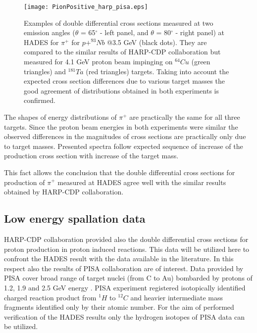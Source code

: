 \begin{figure}[!h]
    \centering
	\texttt{[image: PionPositive\_harp\_pisa.eps]}%
	\caption{\label{Comp_HARP_pip} 
		Examples of double differential cross sections measured at two emission angles 
		($\theta$ = 65$^{\circ}$ - left panel, and $\theta$ = 80$^{\circ}$ - right panel) 
		at HADES for $\pi^{+}$ for $p+^{93}Nb$ @3.5 GeV (black dots). 
		They are compared to the similar results of HARP-CDP collaboration but measured for 4.1 GeV proton 
		beam impinging on $^{64}Cu$ (green triangles) \cite{HARP_CDP_Cu_2009} and $^{181}Ta$ 
		(red triangles) \cite{HARP_CDP_Ta_2009} targets.
		Taking into account the expected cross section differences due to various target masses 
		the good agreement of distributions obtained in both experiments is confirmed.
	}
\end{figure}

The shapes of energy distributions of $\pi^{+}$  
are practically the same for all three targets.
Since the proton beam energies in both experiments were similar the observed differences in the magnitudes of cross sections are practically only due to target masses. Presented spectra   
follow expected sequence of increase of the production cross section with increase of the target mass. 

This fact allows the conclusion that 
the double differential cross sections for production of $\pi^{+}$ measured at HADES agree 
well with the similar results obtained by HARP-CDP collaboration.


\subsection{\label{spal_data} Low energy spallation data}

HARP-CDP collaboration provided also the double differential cross sections for proton production in proton induced reactions. This data will be utilized here to confront the HADES result with the data available in the literature. In this respect also the
results of PISA collaboration 
\cite{fidelus2017non}  
are of interest. Data provided by PISA cover broad range of target nuclei (from C to Au) bombarded by protons of 1.2, 1.9 and 2.5 GeV energy \cite{bubak2007non,budzanowski2008competition,budzanowski2009variation,budzanowski2010comparison,fidelus2014sequential,fidelus2017non}. PISA experiment registered isotopically identified charged reaction product from $^{1}H$ to $^{12}C$ and heavier intermediate mass fragments identified only by their atomic number. 
For the aim of performed verification of the HADES results only the 
hydrogen isotopes of PISA data can be utilized.

